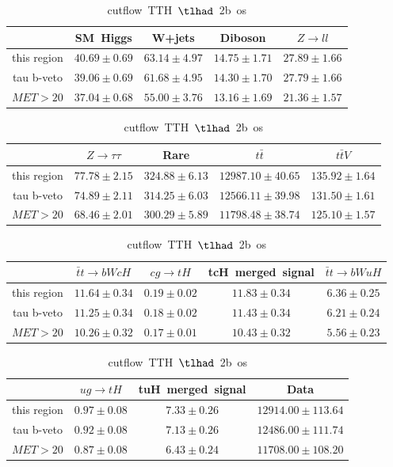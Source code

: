 \begin{table}
\caption{cutflow~TTH~$\tlhad$~2b~os}
\centering
\begin{tabular}{|c|c|c|c|c|} \hline
 & SM~Higgs & W+jets & Diboson & $Z\to ll$\\\hline
this region & $40.69\pm0.69$ & $63.14\pm4.97$ & $14.75\pm1.71$ & $27.89\pm1.66$\\\hline
tau b-veto & $39.06\pm0.69$ & $61.68\pm4.95$ & $14.30\pm1.70$ & $27.79\pm1.66$\\\hline
$MET>20$ & $37.04\pm0.68$ & $55.00\pm3.76$ & $13.16\pm1.69$ & $21.36\pm1.57$\\\hline
\end{tabular}
\begin{tabular}{|c|c|c|c|c|} \hline
 & $Z\to \tau\tau$ & Rare & $t\bar{t}$ & $t\bar{t}V$\\\hline
this region & $77.78\pm2.15$ & $324.88\pm6.13$ & $12987.10\pm40.65$ & $135.92\pm1.64$\\\hline
tau b-veto & $74.89\pm2.11$ & $314.25\pm6.03$ & $12566.11\pm39.98$ & $131.50\pm1.61$\\\hline
$MET>20$ & $68.46\pm2.01$ & $300.29\pm5.89$ & $11798.48\pm38.74$ & $125.10\pm1.57$\\\hline
\end{tabular}
\begin{tabular}{|c|c|c|c|c|} \hline
 & $\bar{t}t\to bWcH$ & $cg\to tH$ & tcH~merged~signal & $\bar{t}t\to bWuH$\\\hline
this region & $11.64\pm0.34$ & $0.19\pm0.02$ & $11.83\pm0.34$ & $6.36\pm0.25$\\\hline
tau b-veto & $11.25\pm0.34$ & $0.18\pm0.02$ & $11.43\pm0.34$ & $6.21\pm0.24$\\\hline
$MET>20$ & $10.26\pm0.32$ & $0.17\pm0.01$ & $10.43\pm0.32$ & $5.56\pm0.23$\\\hline
\end{tabular}
\begin{tabular}{|c|c|c|c|} \hline
 & $ug\to tH$ & tuH~merged~signal & Data\\\hline
this region & $0.97\pm0.08$ & $7.33\pm0.26$ & $12914.00\pm113.64$\\\hline
tau b-veto & $0.92\pm0.08$ & $7.13\pm0.26$ & $12486.00\pm111.74$\\\hline
$MET>20$ & $0.87\pm0.08$ & $6.43\pm0.24$ & $11708.00\pm108.20$\\\hline
\end{tabular}
\label{tab:cutflow_reg1l1tau2b3j_os}
\end{table}
